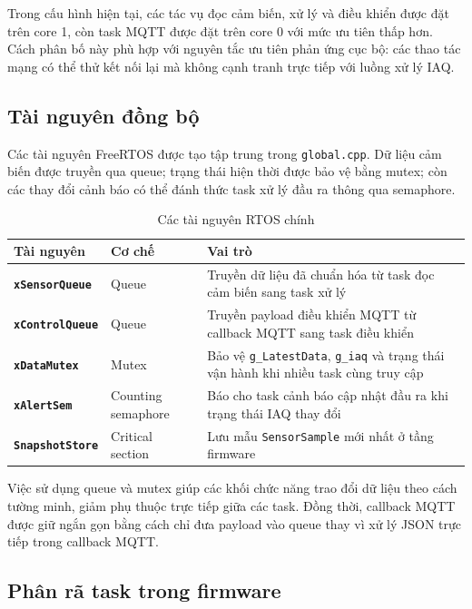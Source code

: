 Trong cấu hình hiện tại, các tác vụ đọc cảm biến, xử lý và điều khiển được đặt trên
core 1, còn task MQTT được đặt trên core 0 với mức ưu tiên thấp hơn. Cách phân bố này
phù hợp với nguyên tắc ưu tiên phản ứng cục bộ: các thao tác mạng có thể thử kết nối lại
mà không cạnh tranh trực tiếp với luồng xử lý IAQ.

\subsection{Tài nguyên đồng bộ}

Các tài nguyên FreeRTOS được tạo tập trung trong \texttt{global.cpp}. Dữ liệu cảm biến
được truyền qua queue; trạng thái hiện thời được bảo vệ bằng mutex; còn các thay đổi
cảnh báo có thể đánh thức task xử lý đầu ra thông qua semaphore.

\begin{table}[H]
    \centering
    \caption{Các tài nguyên RTOS chính}
    \small
    \setlength{\tabcolsep}{4pt}
    \begin{tabularx}{\textwidth}{>{\bfseries}p{} p{} X}
        \toprule
        Tài nguyên & Cơ chế & Vai trò \\
        \midrule
        \texttt{xSensorQueue} & Queue & Truyền dữ liệu đã chuẩn hóa từ task đọc cảm biến sang task xử lý \\
        \texttt{xControlQueue} & Queue & Truyền payload điều khiển MQTT từ callback MQTT sang task điều khiển \\
        \texttt{xDataMutex} & Mutex & Bảo vệ \texttt{g\_LatestData}, \texttt{g\_iaq} và trạng thái vận hành khi nhiều task cùng truy cập \\
        \texttt{xAlertSem} & Counting semaphore & Báo cho task cảnh báo cập nhật đầu ra khi trạng thái IAQ thay đổi \\
        \texttt{SnapshotStore} & Critical section & Lưu mẫu \texttt{SensorSample} mới nhất ở tầng firmware \\
        \bottomrule
    \end{tabularx}
\end{table}

Việc sử dụng queue và mutex giúp các khối chức năng trao đổi dữ liệu theo cách tường
minh, giảm phụ thuộc trực tiếp giữa các task. Đồng thời, callback MQTT được giữ ngắn gọn
bằng cách chỉ đưa payload vào queue thay vì xử lý JSON trực tiếp trong callback MQTT.

\subsection{Phân rã task trong firmware}


